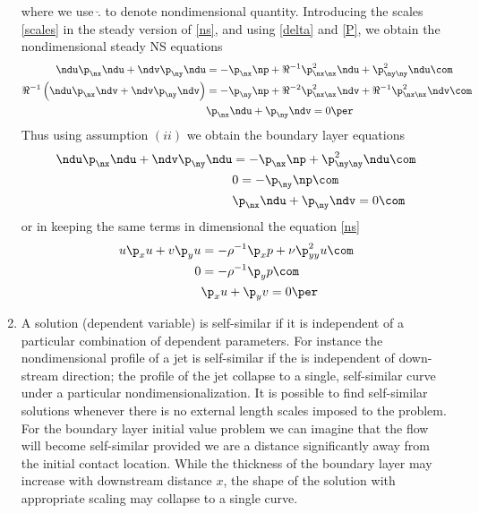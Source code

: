 \documentclass[11pt]{article}
\begin{document}
\begin{enumerate}[label=(\alph*)]
    \eeq
    where we use $\breve .$ to denote nondimensional quantity. Introducing the scales \eqref{scales} in the steady version of \eqref{ns}, and using  \eqref{delta} and \eqref{P}, we obtain the nondimensional steady NS equations 
        \begin{align}
            \label{ns_nd}
            \ndu\p_{\nx} \ndu + \ndv\p_{\ny} \ndu &= -\p_{\nx} \np + \Re^{-1} \p^2_{\nx\nx}\ndu +\p^2_{\ny\ny}\ndu\com\nonumber\\
            \Re^{-1} \left(\ndu\p_{\nx} \ndv + \ndv\p_{\ny} \ndv\right) &= -\p_{\ny} \np + \Re^{-2} \p^2_{\nx\nx}\ndv +  \Re^{-1} \p^2_{\nx\nx}\ndv\com\nonumber\\
                                                                        &\p_{\nx} \ndu + \p_{\ny} \ndv = 0\per
        \end{align}
        Thus using assumption $(ii)$ we obtain the boundary layer equations
        \begin{align}
            \label{ns__bl}
            \ndu\p_{\nx} \ndu + \ndv\p_{\ny} \ndu &= -\p_{\nx} \np + \p^2_{\ny\ny}\ndu\com\nonumber\\
                                                  & 0 = -\p_{\ny} \np \nonumber \com\\
             &\p_{\nx} \ndu + \p_{\ny} \ndv = 0\com
        \end{align}
        or in keeping the same terms in dimensional the equation \eqref{ns} 
\begin{align}
            \label{ns_bl}
           u\p_x u + v\p_y u &= -\rho^{-1}\p_x p + \nu  \p^2_{yy}u\com\nonumber\\
         0 &= -\rho^{-1}\p_y p \nonumber\com \\
           &\p_x u + \p_y v= 0\per
\end{align}

\item A solution (dependent variable) is self-similar if it is independent of a particular combination of dependent parameters. For instance the nondimensional profile of a jet is self-similar if the is independent of down-stream direction; the profile of the jet collapse to a single, self-similar curve under a particular nondimensionalization. It is possible to find self-similar solutions whenever there is no external length scales imposed to the problem. For the boundary layer initial value problem we can imagine that the flow will become self-similar provided we are a distance significantly away from the initial contact location. While the thickness of the boundary layer may increase with downstream distance $x$, the shape of the solution with appropriate scaling may collapse to a single curve.


\end{enumerate}
\end{document}
